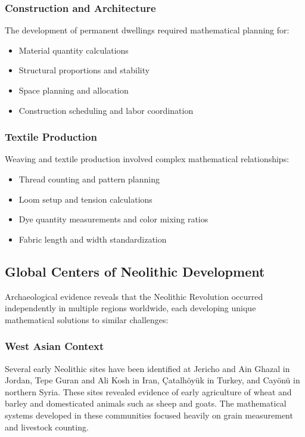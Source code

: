 \documentclass[12pt, oneside, openany]{book}
\begin{document}
\subsubsection{Construction and Architecture}

The development of permanent dwellings required mathematical planning for:
\begin{itemize}
	\item Material quantity calculations
	\item Structural proportions and stability
	\item Space planning and allocation
	\item Construction scheduling and labor coordination
\end{itemize}

\subsubsection{Textile Production}

Weaving and textile production involved complex mathematical relationships:
\begin{itemize}
	\item Thread counting and pattern planning
	\item Loom setup and tension calculations
	\item Dye quantity measurements and color mixing ratios
	\item Fabric length and width standardization
\end{itemize}

\subsection{Global Centers of Neolithic Development}

Archaeological evidence reveals that the Neolithic Revolution occurred independently in multiple regions worldwide, each developing unique mathematical solutions to similar challenges:

\subsubsection{West Asian Context}

Several early Neolithic sites have been identified at Jericho and Ain Ghazal in Jordan, Tepe Guran and Ali Kosh in Iran, Çatalhöyük in Turkey, and Cayönü in northern Syria. These sites revealed evidence of early agriculture of wheat and barley and domesticated animals such as sheep and goats. The mathematical systems developed in these communities focused heavily on grain measurement and livestock counting.
\end{document}
